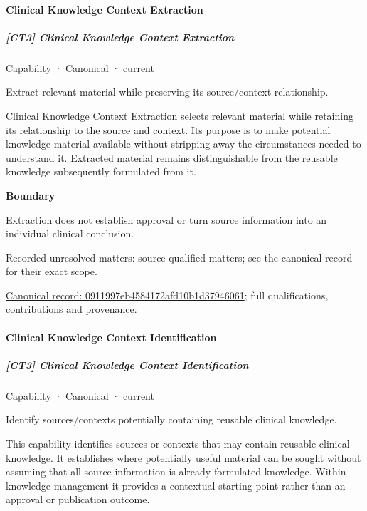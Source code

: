\paragraph{Clinical Knowledge Context Extraction}

\subparagraph{[CT3] Clinical Knowledge Context Extraction}

\label{element:0911997eb4584172afd10b1d37946061}
{\small Capability · Canonical · current}\par

Extract relevant material while preserving its source/context relationship.



Clinical Knowledge Context Extraction selects relevant material while retaining its relationship to the source and context. Its purpose is to make potential knowledge material available without stripping away the circumstances needed to understand it. Extracted material remains distinguishable from the reusable knowledge subsequently formulated from it.



\textbf{Boundary}



Extraction does not establish approval or turn source information into an individual clinical conclusion.


{\small Recorded unresolved matters: source-qualified matters; see the canonical record for their exact scope.}\par
{\footnotesize \href{../../../../continuum/strategy/capability/0911997eb4584172afd10b1d37946061.md}{Canonical record: 0911997eb4584172afd10b1d37946061}; full qualifications, contributions and provenance.}\par
\paragraph{Clinical Knowledge Context Identification}

\subparagraph{[CT3] Clinical Knowledge Context Identification}

\label{element:a0facf9015514223a928e39fcbbb6bee}
{\small Capability · Canonical · current}\par

Identify sources/contexts potentially containing reusable clinical knowledge.



This capability identifies sources or contexts that may contain reusable clinical knowledge. It establishes where potentially useful material can be sought without assuming that all source information is already formulated knowledge. Within knowledge management it provides a contextual starting point rather than an approval or publication outcome.



